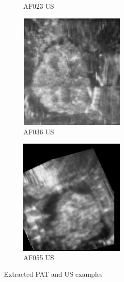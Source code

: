 \begin{figure}
\begin{subfigure}[b]{.24\linewidth}
\caption{AF023 US}
\end{subfigure}
\begin{subfigure}[b]{.24\linewidth}
\includegraphics[width=\linewidth]{Figs/US36.png}
\caption{AF036 US}
\end{subfigure}
\begin{subfigure}[b]{.24\linewidth}
\includegraphics[width=\linewidth]{Figs/US55_13.jpg}
\caption{AF055 US}
\end{subfigure}
\caption{Extracted PAT and US examples}
\label{pat_us_example}
\end{figure}

